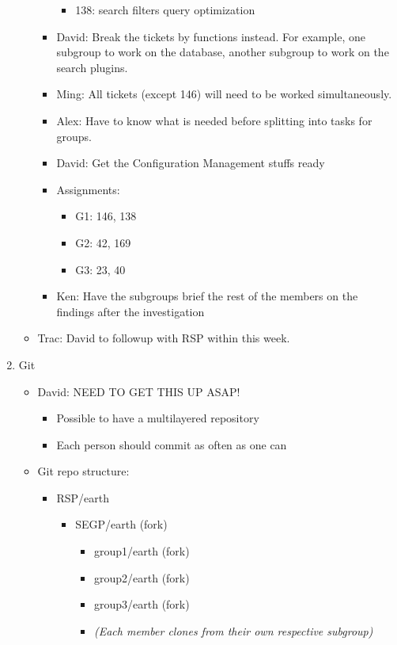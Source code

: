 \documentclass{letter}
\begin{document}
\begin{enumerate}
\begin{itemize}
\begin{itemize}
\begin{itemize}
							\item 138: search filters query optimization
						\end{itemize}
					\item David: Break the tickets by functions instead. For example, one subgroup to work on the database, another subgroup to work on the search plugins. 
					\item Ming: All tickets (except 146) will need to be worked simultaneously.
					\item Alex: Have to know what is needed before splitting into tasks for groups.
					\item David: Get the Configuration Management stuffs ready
					\item Assignments:
						\begin{itemize}
							\item G1: 146, 138
							\item G2: 42, 169
							\item G3: 23, 40
						\end{itemize}
					\item Ken: Have the subgroups brief the rest of the members on the findings after the investigation
				\end{itemize}
			\item Trac: David to followup with RSP within this week. 
		\end{itemize}
	\item Git
		\begin{itemize}
			\item David: NEED TO GET THIS UP ASAP!
				\begin{itemize}
					\item Possible to have a multilayered repository
					\item Each person should commit as often as one can
				\end{itemize}
			\item Git repo structure: 
				\begin{itemize}
					\item RSP/earth 
						\begin{itemize}
							\item SEGP/earth (fork)
								\begin{itemize}
									\item group1/earth (fork)
									\item group2/earth (fork)
									\item group3/earth (fork)
									\item \textsl{(Each member clones from their own respective subgroup)}

\end{itemize}
\end{itemize}
\end{itemize}
\end{itemize}
\end{enumerate}
\end{document}
